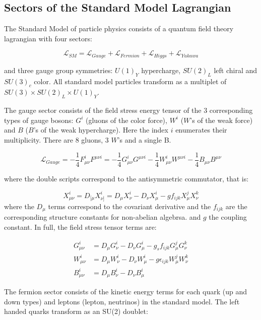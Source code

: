 \subsection{Sectors of the Standard Model Lagrangian}
{
The Standard Model of particle physics consists of a quantum field theory lagrangian with four sectors:

\begin{equation}
\mathcal{L}_{SM} = \mathcal{L}_{Gauge} + \mathcal{L}_{Fermion} + \mathcal{L}_{Higgs} + \mathcal{L}_{Yukawa}
\end{equation}

and three gauge group symmetries: $U(1)_Y$ hypercharge, 
$SU(2)_L$ left chiral and $SU(3)_c$ color. All standard model particles transform as a multiplet of
 $SU(3) \times SU(2)_L \times U(1)_Y$.

The gauge sector consists of the field stress energy tensor of the 3 corresponding types of gauge bosons:
 $G^i$ (gluons of the color force), $W^i$ ($W$'s of the weak force) and $B$ ($B$'s of the weak hypercharge). 
Here the index $i$ enumerates their multiplicity. There are 8 gluons, 3 $W$'s and a single B. 

\begin{equation}
\mathcal{L}_{Gauge} = - \frac{1}{4} F_{\mu\nu}^{i} F^{\mu\nu i} =  - \frac{1}{4} G_{\mu\nu}^{i} G^{\mu\nu i} - \frac{1}{4} W^{i}_{\mu\nu} W^{\mu\nu i} - \frac{1}{4} B_{\mu\nu}B^{\mu\nu} 
\end{equation}

where the double scripts correspond to the antisymmetric commutator, that is:

\begin{equation}
X_{\mu\nu}^i = D_{[\mu} X_{\nu]}^i  = D_\mu X_\nu^i - D_\nu X_\mu^i - g f_{ijk} X_\mu^j X_\nu^k
\end{equation}
where the $D_\mu$ terms correspond to the covariant derivative and the $f_{ijk}$ are the corresponding structure constants for 
non-abelian algebrsa. and $g$ the coupling constant. In full, the field stress tensor terms are:

\begin{align*}
G_{\mu\nu}^i &=  D_\mu G_\nu^i - D_\nu G_\mu^i - g_s f_{ijk} G_\mu^j G_\nu^k\\ 
W_{\mu\nu}^i &=  D_\mu W_\nu^i - D_\nu W_\mu^i - g \epsilon_{ijk} W_\mu^j W_\nu^k\\ 
B_{\mu\nu}^i &=  D_\mu B_\nu^i - D_\nu B_\mu^i
\end{align*}

The fermion sector consists of the kinetic energy terms for each quark (up and down types) and leptons (lepton, neutrinos) in the standard model.
The left handed quarks transform as an SU(2) doublet:

}
